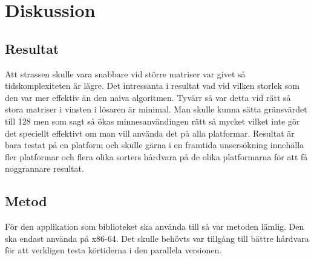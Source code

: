 \section{Diskussion}
\subsection{Resultat}
Att strassen skulle vara snabbare vid större matriser var givet så tidskomplexiteten är lägre. Det intressanta i resultat vad vid vilken storlek som den var mer effektiv än den naiva algoritmen. Tyvärr så var detta vid rätt så stora matriser i vinsten i lösaren är minimal. Man skulle kunna sätta gränsvärdet till 128 men som sagt så ökas minnesanvändingen rätt så mycket vilket inte gör det speciellt effektivt om man vill använda det på alla platformar. Resultat är bara testat på en platform och skulle gärna i en framtida unsersökning innehälla fler platformar och flera olika sorters hårdvara på de olika platformarna för att få noggrannare resultat.
\subsection{Metod}
För den applikation som biblioteket ska använda till så var metoden lämlig. Den ska endast använda på x86-64.
Det skulle behövts var tillgång till bättre hårdvara för att verkligen testa körtiderna i den parallela versionen.